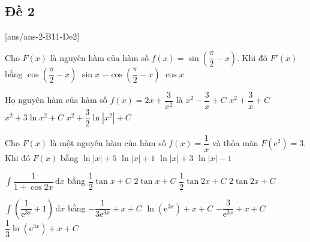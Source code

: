 \subsection{Đề 2}
[ans/ans-2-B11-De2]
\caulc
\begin{ex}%
	Cho $F(x)$ là nguyên hàm của hàm số $f(x)=\sin \left(\dfrac{\pi}{2}-x\right)$. Khi đó $F'(x)$ bằng
	\choice
	{$\cos \left(\dfrac{\pi}{2}-x\right)$}
	{$\sin x$}
	{$-\cos \left(\dfrac{\pi}{2}-x\right)$}
	{\True $\cos x$}
\end{ex}

\begin{ex}%
	Họ nguyên hàm của hàm số $f(x)=2x+\dfrac{3}{x^2}$ là
	\choice
	{\True $x^2-\dfrac{3}{x}+C$}
	{$x^2+\dfrac{3}{x}+C$}
	{$x^2+3\ln{x^2}+C$}
	{$x^2+\dfrac{3}{2}\ln|x^2|+C$}
\end{ex}

\begin{ex}%
	Cho $F(x)$ là một nguyên hàm của hàm số $f(x)=\dfrac{1}{x}$ và thỏa mãn $F\left(\mathrm{e}^2\right)=3$. Khi đó $F(x)$ bằng
	\choice
	{$\ln |x|+5$}
	{\True $\ln |x|+1$}
	{$\ln |x|+3$}
	{$\ln |x|-1$}
\end{ex}

\begin{ex}%
	$\displaystyle\int \dfrac{1}{1+\cos 2x} \mathrm{\,d}x$ bằng
	\choice
	{\True $\dfrac{1}{2}\tan x+C$}
	{$2\tan x+C$}
	{$\dfrac{1}{2}\tan 2x+C$}
	{$2\tan 2x+C$}
\end{ex}

\begin{ex}%
	$\displaystyle\int\left(\dfrac{1}{\mathrm{e}^{3x}}+1\right)\mathrm{\,d}x$ bằng
	\choice
	{\True $-\dfrac{1}{3 \mathrm{e}^{3x}}+x+C$}
	{$\ln \left(\mathrm{e}^{3x}\right)+x+C$}
	{$-\dfrac{3}{\mathrm{e}^{3x}}+x+C$}
	{$\dfrac{1}{3}\ln \left(\mathrm{e}^{3x}\right)+x+C$}
\end{ex}

